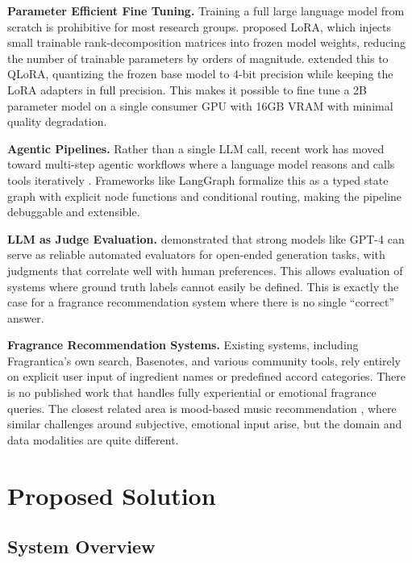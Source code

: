 \documentclass[11pt,a4paper]{article}
\begin{document}
\textbf{Parameter Efficient Fine Tuning.} Training a full large language model from scratch is prohibitive for most research groups. \citet{hu2022lora} proposed LoRA, which injects small trainable rank-decomposition matrices into frozen model weights, reducing the number of trainable parameters by orders of magnitude. \citet{dettmers2023qlora} extended this to QLoRA, quantizing the frozen base model to 4-bit precision while keeping the LoRA adapters in full precision. This makes it possible to fine tune a 2B parameter model on a single consumer GPU with 16GB VRAM with minimal quality degradation.

\textbf{Agentic Pipelines.} Rather than a single LLM call, recent work has moved toward multi-step agentic workflows where a language model reasons and calls tools iteratively \citep{yao2023react}. Frameworks like LangGraph \citep{langgraph2024} formalize this as a typed state graph with explicit node functions and conditional routing, making the pipeline debuggable and extensible.

\textbf{LLM as Judge Evaluation.} \citet{zheng2023judging} demonstrated that strong models like GPT-4 can serve as reliable automated evaluators for open-ended generation tasks, with judgments that correlate well with human preferences. This allows evaluation of systems where ground truth labels cannot easily be defined. This is exactly the case for a fragrance recommendation system where there is no single ``correct'' answer.

\textbf{Fragrance Recommendation Systems.} Existing systems, including Fragrantica's own search, Basenotes, and various community tools, rely entirely on explicit user input of ingredient names or predefined accord categories. There is no published work that handles fully experiential or emotional fragrance queries. The closest related area is mood-based music recommendation \citep{schedl2018music}, where similar challenges around subjective, emotional input arise, but the domain and data modalities are quite different.

\section{Proposed Solution}
\label{sec:solution}

\subsection{System Overview}
\end{document}
